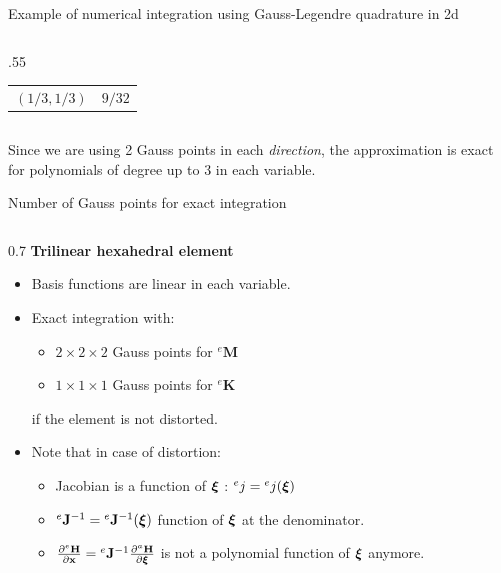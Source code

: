 \documentclass[aspectratio=169]{beamer}
\begin{document}
\begin{frame}{Example of numerical integration using Gauss-Legendre quadrature in 2d}
\begin{columns}[T]
\begin{column}{.55\textwidth}
\begin{tabular}{c|c}
                $(1/3,1/3)$                       & $9/32$               \\[5pt]
            \end{tabular}
        \end{column}
    \end{columns}
    \vspace{0.5cm}
    \begin{tcolorbox}[colback=darkred!10,colframe=darkred!40!black,]
        Since we are using 2 Gauss points in each \emph{direction}, the approximation is exact for polynomials of degree up to $3$ in each variable.
    \end{tcolorbox}
\end{frame}

\begin{frame}{Number of Gauss points for exact integration}
    \begin{columns}
        \begin{column}{0.7\textwidth}
            \textbf{Trilinear hexahedral element}
            \begin{itemize}
                \item Basis functions are linear in each variable.
                \item Exact integration with:
                      \begin{itemize}
                          \item $2\times2\times2$ Gauss points for ${}^e\mathbf M$
                          \item $1\times1\times1$ Gauss points for ${}^e\mathbf K$
                      \end{itemize}
                      if the element is not distorted.
                \item Note that in case of distortion:
                      \begin{itemize}
                          \item Jacobian is a function of $\boldsymbol\xi$ : ${}^ej={}^ej(\boldsymbol\xi)$\vspace{0.2cm}
                          \item ${}^e\mathbf J^{-1}={}^e\mathbf J^{-1}(\boldsymbol\xi)$ function of $\boldsymbol\xi$ at the denominator.\vspace{0.2cm}
                          \item $\frac{\partial {}^e\mathbf H}{\partial \bold x}={}^e\mathbf J^{-1}\frac{\partial {}^a\mathbf H}{\partial \boldsymbol\xi} $ is not a polynomial function of $\boldsymbol\xi$ anymore.
                      \end{itemize}

\end{itemize}
\end{column}
\end{columns}
\end{frame}
\end{document}
